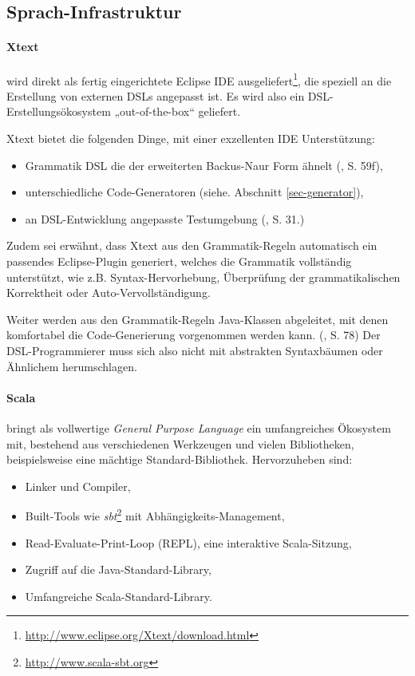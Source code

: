 \subsection{Sprach-Infrastruktur}\label{sec-infrastruktur}

\paragraph{Xtext} wird direkt als fertig eingerichtete Eclipse IDE
ausgeliefert\footnote{\url{http://www.eclipse.org/Xtext/download.html}},
die speziell an die Erstellung von externen DSLs angepasst
ist. Es wird also ein DSL-Erstellungsökosystem „out-of-the-box“ geliefert.

Xtext bietet die folgenden Dinge, mit einer exzellenten IDE Unterstützung:

\begin{itemize}
  \item Grammatik DSL die der erweiterten Backus-Naur Form ähnelt
        (\cite{xtext}, S. 59f),
  \item unterschiedliche Code-Generatoren (siehe. Abschnitt \ref{sec-generator}),
  \item an DSL-Entwicklung angepasste Testumgebung (\cite{xtext}, S. 31.)
\end{itemize}

Zudem sei erwähnt, dass Xtext aus den Grammatik-Regeln automatisch ein
passendes Eclipse-Plugin generiert, welches die Grammatik vollständig
unterstützt, wie z.B. Syntax-Hervorhebung, Überprüfung der grammatikalischen
Korrektheit oder Auto-Vervollständigung.

Weiter werden aus den Grammatik-Regeln Java-Klassen abgeleitet, mit denen
komfortabel die Code-Generierung vorgenommen werden kann. (\cite{xtext}, S. 78)
Der DSL-Programmierer
muss sich also nicht mit abstrakten Syntaxbäumen oder Ähnlichem herumschlagen.

\paragraph{Scala} bringt als vollwertige \emph{General Purpose Language}
ein umfangreiches Ökosystem mit, bestehend aus verschiedenen Werkzeugen
und vielen Bibliotheken, beispielsweise eine mächtige Standard-Bibliothek.
Hervorzuheben sind:

\begin{itemize}
  \item Linker und Compiler,
  \item Built-Tools wie \emph{sbt}\footnote{\url{http://www.scala-sbt.org}}
        mit Abhängigkeits-Management,
  \item Read-Evaluate-Print-Loop (REPL), eine interaktive Scala-Sitzung,
  \item Zugriff auf die Java-Standard-Library,
  \item Umfangreiche Scala-Standard-Library.
\end{itemize}

